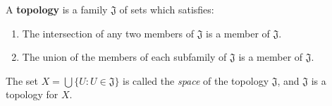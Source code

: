 A \textbf{topology} is a family $\mathfrak{J}$ of sets which satisfies:

\begin{enumerate}
\item The intersection of any two members of $\mathfrak{J}$ is a member of $\mathfrak{J}$.
\item The union of the members of each subfamily of $\mathfrak{J}$ is a member of $\mathfrak{J}$.
\end{enumerate}

The set $X = \bigcup \{U : U \in \mathfrak{J}\}$ is called the \textit{space} of the topology $\mathfrak{J}$, and $\mathfrak{J}$ is a topology for $X$.
